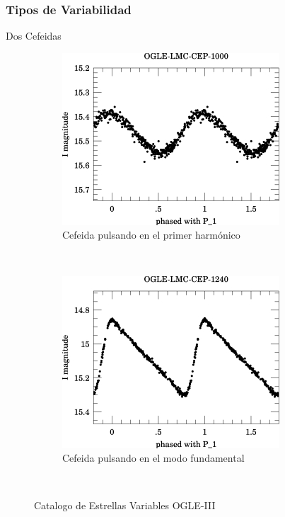 \documentclass{beamer}
\begin{document}
\begin{frame}
  \frametitle{Tipos de Variabilidad}
  Dos Cefeidas
  \begin{figure}
    \centering
    \begin{subfigure}[b]{0.4\textwidth}
      \includegraphics[width=\textwidth]{./img/OGLE-LMC-CEP-1000_1.jpg}
      \caption{Cefeida pulsando en el primer harmónico}
    \end{subfigure}%
    ~ %
    \begin{subfigure}[b]{0.4\textwidth}
      \includegraphics[width=\textwidth]{./img/OGLE-LMC-CEP-1240_1.jpg}
      \caption{Cefeida  pulsando en el modo fundamental}
    \end{subfigure}
    ~ %
    \caption{Catalogo de Estrellas Variables OGLE-III}
  \end{figure}
\end{frame}
\end{document}
